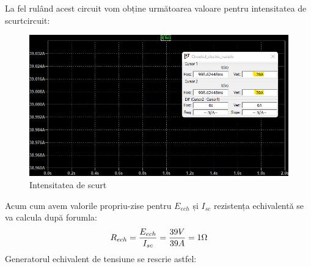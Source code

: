 \documentclass[12pt, a4paper]{article}
\begin{document}
La fel rulând acest circuit vom obține următoarea valoare pentru intensitatea de scurtcircuit:

\begin{figure}[h]
    \centering
    \includegraphics[width=\linewidth, height=\textheight, keepaspectratio]{Intensitatea_de_scurt.png}
    \caption{Intensitatea de scurt}
    \label{fig:scurt}
\end{figure}

Acum cum avem valorile propriu-zise pentru $E_{ech}$ și $I_{sc}$ rezistența echivalentă se va calcula după forumla:
$$R_{ech} = \frac{E_{ech}}{I_{sc}} = \frac{39V}{39A} = 1\ohm$$
Generatorul echivalent de tensiune se rescrie astfel:
\end{document}
